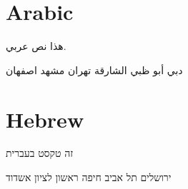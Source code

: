 \documentclass[a4paper]{article}
\begin{document}
\section{Arabic}
\begin{Arabic}%

هذا نص عربي.

دبي
أبو ظبي
الشارقة
تهران
مشهد
اصفهان

\end{Arabic}

\section{Hebrew}
\begin{hebrew}



זה טקסט בעברית

ירושלים
תל אביב
חיפה
ראשון לציון
אשדוד

\end{hebrew}


\printindex
\end{document}
